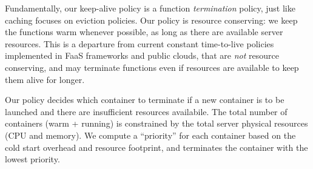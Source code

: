 Fundamentally, our keep-alive policy is a function \emph{termination} policy, just like caching focuses on eviction policies.  
Our policy is resource conserving: we keep the functions warm whenever possible, as long as there are available server resources. 
This is a departure from current constant time-to-live policies implemented in FaaS frameworks and public clouds, that are \emph{not} resource conserving, and may terminate functions even if resources are available to keep them alive for longer. 

Our policy decides which container to terminate if a new container is to be launched and there are insufficient resources availabile. 
The total number of containers (warm + running) is constrained by the total server physical resources (CPU and memory). 
We compute a ``priority'' for each container based on the cold start overhead and resource footprint, and terminates the container with the lowest priority.
%


%
%
%
%

%






